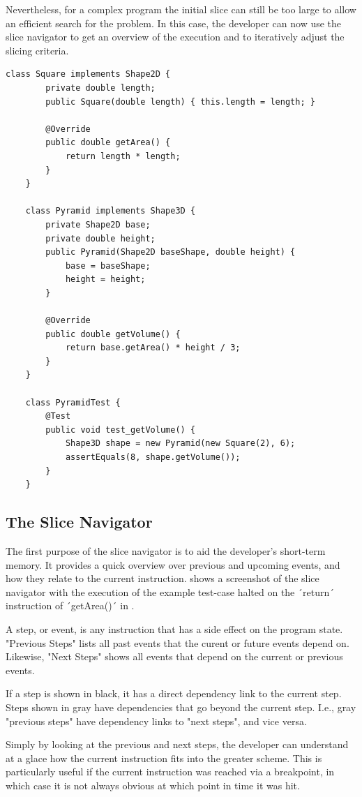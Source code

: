 ﻿\documentclass[
      english,
			conference,
      ]{IEEEtran}
\begin{document}
Nevertheless, for a complex program the initial slice can still be too large to allow an efficient search for the problem.
In this case, the developer can now use the slice navigator to get an overview of the execution and to iteratively adjust the slicing criteria.

\begin{lstlisting}[float=t,label=lst:example,caption={Example program with a failing test case}]
	class Square implements Shape2D {
		private double length;
		public Square(double length) { this.length = length; }
		
		@Override
		public double getArea() { 
			return length * length;
		}
	}
	
	class Pyramid implements Shape3D {
		private Shape2D base;
		private double height;
		public Pyramid(Shape2D baseShape, double height) {
			base = baseShape;
			height = height;
		}
		
		@Override
		public double getVolume() { 
			return base.getArea() * height / 3; 
		}
	}
	
	class PyramidTest {
		@Test
		public void test_getVolume() {
			Shape3D shape = new Pyramid(new Square(2), 6);
			assertEquals(8, shape.getVolume());
		}
	}
\end{lstlisting}

\subsection{The Slice Navigator}

The first purpose of the slice navigator is to aid the developer's short-term memory.
It provides a quick overview over previous and upcoming events, and how they relate to the current instruction.
 shows a screenshot of the slice navigator with the execution of the example test-case halted on the ´return´ instruction of ´getArea()´ in .

A step, or event, is any instruction that has a side effect on the program state.
"Previous Steps" lists all past events that the curent or future events depend on.
Likewise, "Next Steps" shows all events that depend on the current or previous events.

If a step is shown in black, it has a direct dependency link to the current step.
Steps shown in gray have dependencies that go beyond the current step.
I.e., gray "previous steps" have dependency links to "next steps", and vice versa.

Simply by looking at the previous and next steps, the developer can understand at a glace how the current instruction fits into the greater scheme.
This is particularly useful if the current instruction was reached via a breakpoint, in which case it is not always obvious at which point in time it was hit.
\end{document}
